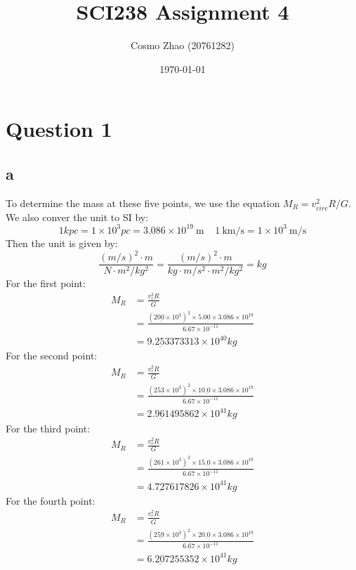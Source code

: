 \documentclass[11pt]{article}
\title{ SCI238 Assignment 4}
\author{ Cosmo Zhao (20761282) }
\date{\today}
\newcommand{\sci}[1]{\times 10^{#1}}
\begin{document}
\maketitle
\pagebreak
\section*{Question 1}
\subsection*{a}
To determine the mass at these five points, we use the equation $M_R = v_{circ}^2 R / G$. We also conver the unit to SI by:
$$
1 kpc = 1 \sci{3} pc = 3.086 \sci{19} \SI[]{}[]{\m} \;\;\;\; 1 \SI[per-mode=symbol]{}{\km\per\s} = 1 \sci{3} \SI[per-mode=symbol]{}{\m\per\s}
$$
Then the unit is given by:
$$
\frac{(m/s)^2 \cdot m}{N\cdot m^2 / kg^2} = \frac{(m/s)^2 \cdot m}{kg \cdot m / s^2 \cdot m^2 / kg^2} = kg 
$$
For the first point:
$$
\begin{aligned}
M_R &= \frac{v_r^2 R}{G} \\
&= \frac{(20\underbar{0} \sci{3})^2 \times 5.0\underbar{0} \times 3.086 \sci{19}}{6.67 \sci{-11}}\\
&= 9.2\underbar{5}3373313 \sci{40} kg
\end{aligned}
$$ 
For the second point:
$$
\begin{aligned}
M_R &= \frac{v_r^2 R}{G} \\
&= \frac{(25\underbar{3} \sci{3})^2 \times 10.\underbar{0} \times 3.086 \sci{19}}{6.67 \sci{-11}}\\
&= 2.9\underbar{6}1495862\sci{41} kg
\end{aligned}
$$
For the third point:
$$
\begin{aligned}
M_R &= \frac{v_r^2 R}{G} \\
&= \frac{(26\underbar{1} \sci{3})^2 \times 15.\underbar{0} \times 3.086 \sci{19}}{6.67 \sci{-11}}\\
&= 4.7\underbar{2}7617826 \sci{41} kg
\end{aligned}
$$
For the fourth point:
$$
\begin{aligned}
M_R &= \frac{v_r^2 R}{G} \\
&= \frac{(25\underbar{9} \sci{3})^2 \times 20.\underbar{0} \times 3.086 \sci{19}}{6.67 \sci{-11}}\\
&= 6.2\underbar{0}7255352 \sci{41} kg
\end{aligned}
$$
\end{document}
